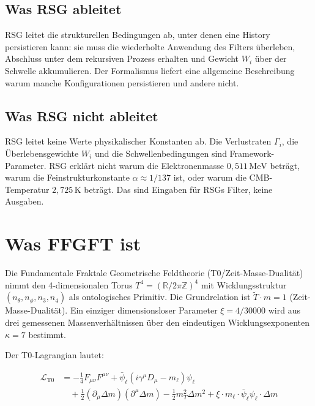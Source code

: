 \subsection{Was RSG ableitet}

RSG leitet die strukturellen Bedingungen ab, unter denen eine History
persistieren kann: sie muss die wiederholte Anwendung des Filters überleben,
Abschluss unter dem rekursiven Prozess erhalten und Gewicht $W_i$ über der
Schwelle akkumulieren. Der Formalismus liefert eine allgemeine Beschreibung
warum manche Konfigurationen persistieren und andere nicht.

\subsection{Was RSG nicht ableitet}

RSG leitet keine Werte physikalischer Konstanten ab. Die Verlustraten
$\Gamma_i$, die Überlebensgewichte $W_i$ und die Schwellenbedingungen sind
Framework-Parameter. RSG erklärt nicht warum die Elektronenmasse
$0{,}511\,\text{MeV}$ beträgt, warum die Feinstrukturkonstante
$\alpha \approx 1/137$ ist, oder warum die CMB-Temperatur $2{,}725\,\text{K}$
beträgt. Das sind Eingaben für RSGs Filter, keine Ausgaben.

\section{Was FFGFT ist}

Die Fundamentale Fraktale Geometrische Feldtheorie (T0/Zeit-Masse-Dualität)
nimmt den 4-dimensionalen Torus $T^4 = (\mathbb{R}/2\pi\mathbb{Z})^4$ mit
Wicklungsstruktur $(n_\theta, n_\phi, n_3, n_4)$ als ontologisches Primitiv.
Die Grundrelation ist $\tilde{T} \cdot m = 1$ (Zeit-Masse-Dualität). Ein
einziger dimensionsloser Parameter $\xi = 4/30000$ wird aus drei gemessenen
Massenverhältnissen über den eindeutigen Wicklungsexponenten $\kappa = 7$
bestimmt.

Der T0-Lagrangian lautet:

\begin{align}
  \mathcal{L}_{\text{T0}} &= -\tfrac{1}{4}F_{\mu\nu}F^{\mu\nu}
    + \bar{\psi}_\ell(i\gamma^\mu D_\mu - m_\ell)\psi_\ell \nonumber\\
    &\quad + \tfrac{1}{2}(\partial_\mu \Delta m)(\partial^\mu \Delta m)
    - \tfrac{1}{2}m_T^2 \Delta m^2
    + \xi \cdot m_\ell \cdot \bar{\psi}_\ell \psi_\ell \cdot \Delta m
\end{align}

